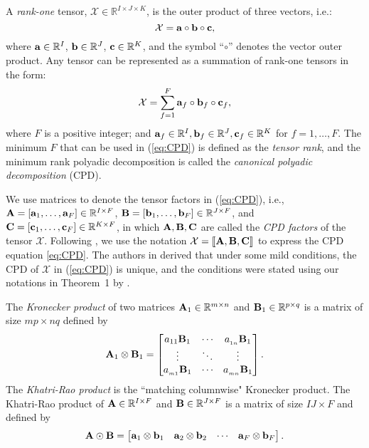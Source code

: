 \documentclass[journal]{IEEEtran}
\newcounter{define}
\newcommand{\cpd}[3]{\llbracket #1, #2, #3 \rrbracket}
\newcommand{\A}{{\bf A}}
\newcommand{\B}{{\bf B}}
\newcommand{\C}{{\bf C}}
\newcommand{\Ten}[1]{\mathcal{#1}}
\newcommand{\revision}[1]{{\color{black} #1}} %
\newcommand{\bc}{{\bf c}}
\newcommand{\ba}{{\bf a}}
\newcommand{\bb}{{\bf b}}
\newcommand{\bA}{{\bf A}}
\newcommand{\bB}{{\bf B}}
\begin{document}
A \emph{rank-one} tensor, $\Ten{X}\in\mathbb{R}^{I\times J\times K}$, is the outer product of three vectors, i.e.:
\[\mathcal{X} = {\bf a} \circ {\bf b}\circ {\bf c},\]
where ${\bf a}\in\mathbb{R}^I$, ${\bf b}\in\mathbb{R}^J$, ${\bf c}\in\mathbb{R}^K$, and the symbol ``$\circ$'' denotes the vector outer product. Any tensor can be represented as a summation of rank-one tensors in the form:
\begin{equation}
    \label{eq:CPD}
    \mathcal{X} = \sum\limits_{f=1}^F {\bf a}_f\circ {\bf b}_f \circ {\bf c}_f,
\end{equation}\vspace{-2pt}
where $F$ is a positive integer; and ${\bf a}_f \in\mathbb{R}^I, {\bf b}_f\in\mathbb{R}^J, {\bf c}_f\in\mathbb{R}^K$ for $f=1,\ldots, F$.
The minimum $F$ that can be used in (\ref{eq:CPD}) is defined as the \emph{tensor rank}, and the minimum rank polyadic decomposition is called the \emph{canonical polyadic decomposition} (CPD). 

We use matrices to denote  the tensor factors in  (\ref{eq:CPD}), i.e., $\A =[\ba_1,\ldots, \ba_F]\in\mathbb{R}^{I\times F}$, $\B =[\bb_1,\ldots, \bb_F]\in\mathbb{R}^{J\times F}$, and $\C =[\bc_1,\ldots, \bc_F]\in\mathbb{R}^{K\times F}$, \revision{in which} $\A, \B, \C$ are called the \emph{CPD factors} of the tensor $\Ten{X}$. Following \cite{Kruskal1977}, we use  the notation $\Ten{X} = \cpd{\A}{\B}{\C}$ to express the CPD equation \eqref{eq:CPD}. \revision{The authors in  \cite{Chiantini2012} derived that under some mild conditions, the CPD of $\Ten{X}$ in (\ref{eq:CPD}) is unique, and the conditions  were stated using our notations  in Theorem~1 by \cite{Zamzam2020}.}

The \emph{Kronecker product} of two matrices $\bA_1\in\mathbb{R}^{m\times n}$ and $\bB_1\in\mathbb{R}^{p\times q}$ is a matrix of size $mp\times nq$ defined by 
\begin{equation*}
       \bA_1 \otimes \bB_1 =\begin{bmatrix}
  a_{11}\bB_1 &\cdots &a_{_{1n}}\bB_1\\
    \vdots &\ddots &\vdots\\
    a_{_{m1}}\bB_1 &\cdots &a_{_{mn}}\bB_1
    \end{bmatrix}.
\end{equation*}
The \emph{Khatri-Rao product} is the ``matching columnwise" Kronecker product. The Khatri-Rao product of 
$\bA\in\mathbb{R}^{I\times F}$ and $\bB\in\mathbb{R}^{J\times F}$ is a matrix of size $IJ \times F$ and defined by
\begin{equation*}
       \bA \odot \bB =\begin{bmatrix}
  \ba_1\otimes \bb_1 &\ba_2\otimes \bb_2& \cdots &\ba_F\otimes \bb_F
    \end{bmatrix}.
\end{equation*}
\end{document}
